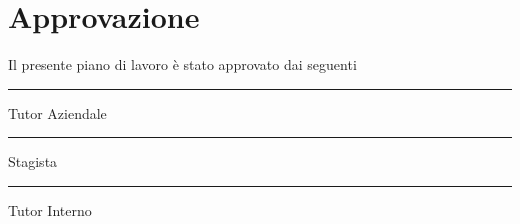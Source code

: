 \section{Approvazione}
Il presente piano di lavoro è stato approvato dai seguenti

\vspace{2cm}
 \hrule width 9cm height 0.4pt depth 0pt \vspace{0.2cm}
\noindent \Greg \hspace{3cm} Tutor Aziendale

\vspace{2cm}
 \hrule width 9cm height 0.4pt depth 0pt \vspace{0.2cm}
\noindent \myName \hspace{3cm} Stagista

\vspace{2cm}
 \hrule width 9cm height 0.4pt depth 0pt \vspace{0.2cm}
\noindent \myProf \hspace{2.7cm} Tutor Interno
